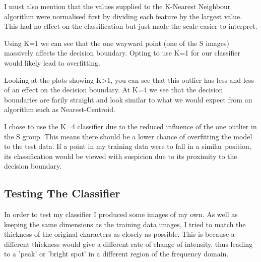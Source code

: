 \documentclass[11pt, a4paper]{article}
\begin{document}
I must also mention that the values supplied to the K-Nearest Neighbour  algorithm were normalised first by dividing each feature by the largest value. This had no effect on the classification but just made the scale easier to interpret.

Using K=1 we can see that the one wayward point (one of the S images) massively affects the decision boundary. Opting to use K=1 for our classifier would likely lead to overfitting. 

Looking at the plots showing K>1, you can see that this outlier has less and less of an effect on the decision boundary. At K=4 we see that the decision boundaries are farily straight and look similar to what we would expect from an algorithm such as Nearest-Centroid. 

I chose to use the K=4 classifier due to the reduced influence of the one outlier in the S group. This means there should be a lower chance of overfitting the model to the test data. If a point in my training data were to fall in a similar position, its classification would be viewed with suspicion due to its proximity to the decision boundary. 

\subsection{Testing The Classifier}

In order to test my classifier I produced some images of my own. As well as keeping the same dimensions as the training data images, I tried to match the thickness of the original characters as closely as possible. This is because a different thickness would give a different rate of change of intensity, thus leading to a 'peak' or 'bright spot' in a different region of the frequency domain. 
\end{document}
